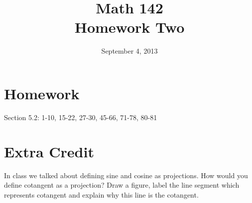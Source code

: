 \documentclass{exam}
\author{}
\date{September 4, 2013}
\title{Math 142 \\ Homework Two}
\begin{document}
  \maketitle

  \section{Homework}
  Section 5.2: 1-10, 15-22, 27-30, 45-66, 71-78, 80-81

  \section{Extra Credit}
  In class we talked about defining sine and cosine as projections.  How would you define cotangent as a projection?
  Draw a figure, label the line segment which represents cotangent and explain why this line is the cotangent.

  \ifprintanswers
\end{document}
